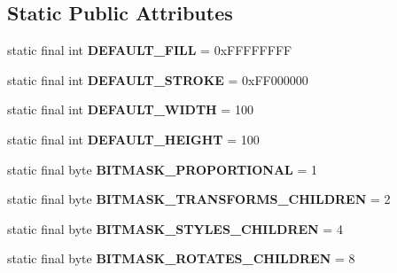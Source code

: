 \subsection*{Static Public Attributes}
\begin{DoxyCompactItemize}
\item 
\hypertarget{classhype_1_1core_1_1drawable_1_1_h_drawable_a096c7aaa3abecaf9bd068e6306328b31}{static final int {\bfseries D\-E\-F\-A\-U\-L\-T\-\_\-\-F\-I\-L\-L} = 0x\-F\-F\-F\-F\-F\-F\-F\-F}\label{classhype_1_1core_1_1drawable_1_1_h_drawable_a096c7aaa3abecaf9bd068e6306328b31}

\item 
\hypertarget{classhype_1_1core_1_1drawable_1_1_h_drawable_a317645a51a477d5a5442be1608357d9f}{static final int {\bfseries D\-E\-F\-A\-U\-L\-T\-\_\-\-S\-T\-R\-O\-K\-E} = 0x\-F\-F000000}\label{classhype_1_1core_1_1drawable_1_1_h_drawable_a317645a51a477d5a5442be1608357d9f}

\item 
\hypertarget{classhype_1_1core_1_1drawable_1_1_h_drawable_a3669839ce7656df4bf98c168131030c0}{static final int {\bfseries D\-E\-F\-A\-U\-L\-T\-\_\-\-W\-I\-D\-T\-H} = 100}\label{classhype_1_1core_1_1drawable_1_1_h_drawable_a3669839ce7656df4bf98c168131030c0}

\item 
\hypertarget{classhype_1_1core_1_1drawable_1_1_h_drawable_a63b3af51850c269f7ad560899337f63d}{static final int {\bfseries D\-E\-F\-A\-U\-L\-T\-\_\-\-H\-E\-I\-G\-H\-T} = 100}\label{classhype_1_1core_1_1drawable_1_1_h_drawable_a63b3af51850c269f7ad560899337f63d}

\item 
\hypertarget{classhype_1_1core_1_1drawable_1_1_h_drawable_ae0c9b686c3e84ec9e342b5a05fbf1b73}{static final byte {\bfseries B\-I\-T\-M\-A\-S\-K\-\_\-\-P\-R\-O\-P\-O\-R\-T\-I\-O\-N\-A\-L} = 1}\label{classhype_1_1core_1_1drawable_1_1_h_drawable_ae0c9b686c3e84ec9e342b5a05fbf1b73}

\item 
\hypertarget{classhype_1_1core_1_1drawable_1_1_h_drawable_aae6ae43c606cd7a7146f1a67afc02ec6}{static final byte {\bfseries B\-I\-T\-M\-A\-S\-K\-\_\-\-T\-R\-A\-N\-S\-F\-O\-R\-M\-S\-\_\-\-C\-H\-I\-L\-D\-R\-E\-N} = 2}\label{classhype_1_1core_1_1drawable_1_1_h_drawable_aae6ae43c606cd7a7146f1a67afc02ec6}

\item 
\hypertarget{classhype_1_1core_1_1drawable_1_1_h_drawable_aa59ad1fa1956cbf7886ee47e546e1372}{static final byte {\bfseries B\-I\-T\-M\-A\-S\-K\-\_\-\-S\-T\-Y\-L\-E\-S\-\_\-\-C\-H\-I\-L\-D\-R\-E\-N} = 4}\label{classhype_1_1core_1_1drawable_1_1_h_drawable_aa59ad1fa1956cbf7886ee47e546e1372}

\item 
\hypertarget{classhype_1_1core_1_1drawable_1_1_h_drawable_a71aeb4b266d9afd1bae3f437c9a22ea3}{static final byte {\bfseries B\-I\-T\-M\-A\-S\-K\-\_\-\-R\-O\-T\-A\-T\-E\-S\-\_\-\-C\-H\-I\-L\-D\-R\-E\-N} = 8}\label{classhype_1_1core_1_1drawable_1_1_h_drawable_a71aeb4b266d9afd1bae3f437c9a22ea3}

\end{DoxyCompactItemize}
